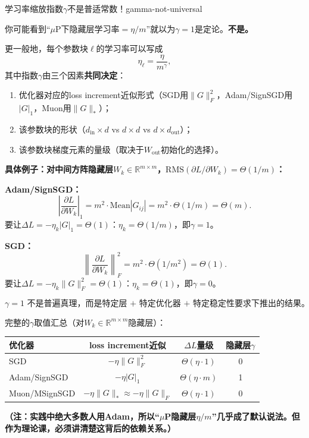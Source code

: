 \documentclass[11pt,a4paper]{article}
\newcommand{\R}{\mathbb{R}}
\begin{document}
\begin{remark}{学习率缩放指数$\gamma$不是普适常数！}{gamma-not-universal}

你可能看到``$\mu$P下隐藏层学习率$=\eta/m$''就以为$\gamma=1$是定论。\textbf{不是。}

更一般地，每个参数块$\ell$的学习率可以写成
\[
\eta_\ell = \frac{\eta}{m^\gamma},
\]
其中指数$\gamma$由三个因素\textbf{共同决定}：
\begin{enumerate}[leftmargin=*]
\item 优化器对应的loss increment近似形式（SGD用$\|G\|_F^2$，Adam/SignSGD用$|G|_1$，Muon用$\|G\|_*$）；
\item 该参数块的形状（$d_{\text{in}}\times d$ vs $d\times d$ vs $d\times d_{\text{out}}$）；
\item 该参数块梯度元素的量级（取决于$W_{\text{out}}$初始化的选择）。
\end{enumerate}

\textbf{具体例子：对中间方阵隐藏层$W_k\in\R^{m\times m}$，$\text{RMS}(\partial L/\partial W_k)=\Theta(1/m)$：}

\medskip
\textbf{Adam/SignSGD：}
\[
\left|\frac{\partial L}{\partial W_k}\right|_1 = m^2\cdot\text{Mean}|G_{ij}| = m^2\cdot\Theta(1/m) = \Theta(m).
\]
要让$\Delta L = -\eta_k|G|_1 = \Theta(1)$：$\eta_k=\Theta(1/m)$，即$\boxed{\gamma=1}$。

\medskip
\textbf{SGD：}
\[
\left\|\frac{\partial L}{\partial W_k}\right\|_F^2 = m^2\cdot\Theta(1/m^2) = \Theta(1).
\]
要让$\Delta L = -\eta_k\|G\|_F^2 = \Theta(1)$：$\eta_k=\Theta(1)$，即$\boxed{\gamma=0}$。

\medskip
\[
\boxed{\gamma=1\text{ 不是普遍真理，而是特定层 + 特定优化器 + 特定稳定性要求下推出的结果。}}
\]

完整的$\gamma$取值汇总（对$W_k\in\R^{m\times m}$隐藏层）：

\begin{center}
\renewcommand{\arraystretch}{1.3}
\begin{tabular}{l|ccc}
\toprule
优化器 & loss increment近似 & $\Delta L$量级 & 隐藏层$\gamma$ \\
\midrule
SGD & $-\eta\|G\|_F^2$ & $\Theta(\eta\cdot 1)$ & 0 \\
Adam/SignSGD & $-\eta|G|_1$ & $\Theta(\eta\cdot m)$ & 1 \\
Muon/MSignSGD & $-\eta\|G\|_*\approx -\eta\|G\|_F$ & $\Theta(\eta\cdot 1)$ & 0 \\
\bottomrule
\end{tabular}
\end{center}

\textbf{（注：实践中绝大多数人用Adam，所以``$\mu$P隐藏层$\eta/m$''几乎成了默认说法。但作为理论课，必须讲清楚这背后的依赖关系。）}
\end{remark}
\end{document}
